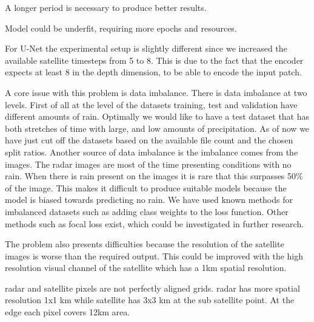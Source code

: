 A longer period is necessary to produce better results.

Model could be underfit, requiring more epochs and resources.

For U-Net the experimental setup is slightly different since we increased the available satellite timesteps from 5 to 8.
This is due to the fact that the encoder expects at least 8 in the depth dimension, to be able to encode the input patch.


A core issue with this problem is data imbalance. There is data imbalance at two levels.
First of all at the level of the datasets training, test and validation have different amounts of rain.
Optimally we would like to have a test dataset that has both stretches of time with large, and low amounts of precipitation.
As of now we have just cut off the datasets based on the available file count and the chosen split ratios.
Another source of data imbalance is the imbalance comes from the images. The radar images are most of the time presenting conditions with no rain.
When there is rain present on the images it is rare that this surpasses 50\% of the image. This makes it difficult to produce suitable models because
the model is biased towards predicting no rain. We have used known methods for imbalanced datasets such as adding class weights to 
the loss function. Other methods such as focal loss exist, which could be investigated in further research.

The problem also presents difficulties because the resolution of the satellite images is worse than the required output.
This could be improved with the high resolution visual channel of the satellite which has a 1km spatial  resolution.

radar and satellite pixels are not perfectly aligned grids.
radar has more spatial resolution 1x1 km while satellite has 3x3 km at the
sub satellite point. At the edge each pixel covers 12km area.